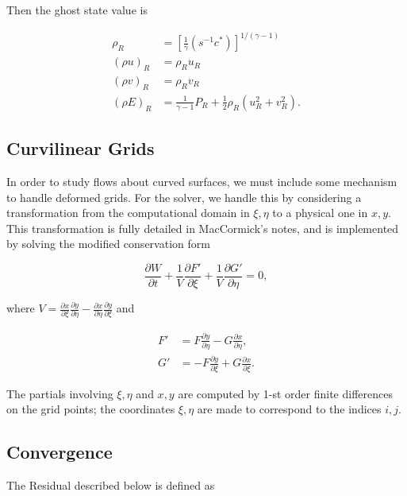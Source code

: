\documentclass{article}
\begin{document}
Then the ghost state value is

\begin{equation}
\begin{aligned}
\rho_R &= [\frac{1}{\gamma}(s^{-1}c^*)]^{1/(\gamma-1)} \\
(\rho u)_R &= \rho_Ru_R \\
(\rho v)_R &= \rho_Rv_R \\
(\rho E)_R &= \frac{1}{\gamma-1}P_R + \frac{1}{2}\rho_R(u_R^2+v_R^2).
\end{aligned}
\end{equation}

\subsection{Curvilinear Grids}
In order to study flows about curved surfaces, we must include some mechanism to handle deformed grids. For the solver, we handle this by considering a transformation from the computational domain in $\xi,\eta$ to a physical one in $x,y$. This transformation is fully detailed in MacCormick's notes, and is implemented by solving the modified conservation form

\begin{equation}
\frac{\partial W}{\partial t} + \frac{1}{V}\frac{\partial F'}{\partial \xi} + \frac{1}{V}\frac{\partial G'}{\partial \eta} = 0,
\end{equation}

where $V=\frac{\partial x}{\partial \xi}\frac{\partial y}{\partial \eta} - \frac{\partial x}{\partial \eta}\frac{\partial y}{\partial \xi}$ and

\begin{equation}
\begin{aligned}
F' &= F\frac{\partial y}{\partial \eta} - G\frac{\partial x}{\partial \eta}, \\
G' &=-F\frac{\partial y}{\partial \xi} + G\frac{\partial x}{\partial \xi}.
\end{aligned}
\end{equation}

The partials involving $\xi,\eta$ and $x,y$ are computed by 1-st order finite differences on the grid points; the coordinates $\xi,\eta$ are made to correspond to the indices $i,j$.

\subsection{Convergence}
The Residual described below is defined as
\end{document}

